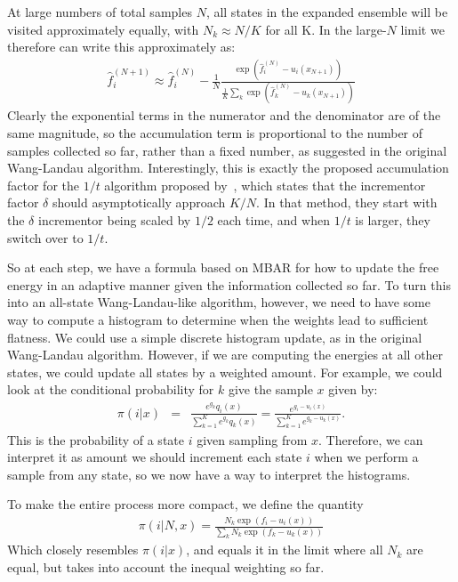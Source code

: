 \documentclass[superscriptaddress,showkeys, nofootinbib, pre, aps]{revtex4-1}
\begin{document}
At large numbers of total samples $N$, all states in the expanded ensemble will be visited approximately equally, with $N_{k} \approx N/K$ for all K. In the large-$N$ limit we therefore can write this approximately as:
\begin{eqnarray}
\hat{f}_{i}^{(N+1)} \approx \hat{f}_{i}^{(N)}- \frac{1}{N}\frac{\exp(\hat{f}_{i}^{(N)}-u_i(x_{N+1}))}{\frac{1}{K}\sum_k \exp(\hat{f}_{k}^{(N)}-u_k(x_{N+1}))}
\end{eqnarray}
Clearly the exponential terms in the numerator and the denominator are of the same magnitude, so the accumulation term is proportional to the number of samples collected so far, rather than a fixed number, as suggested in the original Wang-Landau
algorithm.  Interestingly, this is exactly the proposed accumulation
factor for the $1/t$ algorithm proposed by~\citet{Belardinelli2007},
which states that the incrementor factor $\delta$ should
asymptotically approach $K/N$. In that method, they start with the $\delta$
incrementor being scaled by $1/2$ each time, and when $1/t$ is
larger, they switch over to $1/t$.

So at each step, we have a formula based on MBAR for how to update the free energy in an adaptive manner given the information collected so far.  To turn this into an all-state Wang-Landau-like algorithm, however, we need to have some way to compute a histogram to determine
when the weights lead to sufficient flatness.  We could use a simple discrete histogram update, as in the original Wang-Landau algorithm. However, if we are computing the energies at all other states, we could update all states by a weighted amount.  For example, we could look at the conditional probability for $k$ give the sample $x$ given
by:
\begin{eqnarray}\label{eq:pi(k|x)-2}
\pi(i | x) &=& \frac{e^{g_k}q_i(x)}{\sum\limits_{k=1}^K e^{g_{k}}q_{k}(x)} = \frac{e^{g_i - u_i(x)}}{\sum\limits_{k=1}^K e^{g_{k} - u_{k}(x)}} .
\end{eqnarray}
This is the probability of a state $i$ given sampling from $x$.
Therefore, we can interpret it as amount we should increment each
state $i$ when we perform a sample from any state, so we now have a
way to interpret the histograms.

To make the entire process more compact, we define the quantity
\begin{eqnarray}
\pi(i|N,x) = \frac{N_k\exp(f_i-u_i(x))}{\sum_k N_k \exp(f_k-u_k(x))}
\end{eqnarray}
Which closely resembles $\pi(i|x)$, and equals it in the limit where
all $N_k$ are equal, but takes into account the inequal weighting so
far.
\end{document}

